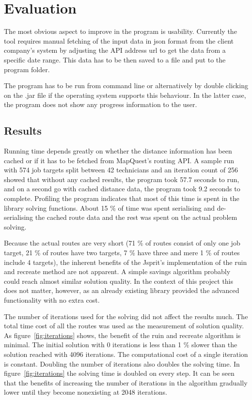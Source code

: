 \chapter{Evaluation}
\label{chapter:evaluation}


The most obvious aspect to improve in the program is usability. Currently the tool requires manual fetching of the input data in json format from the client company's system by adjusting the API address url to get the data from a specific date range. This data has to be then saved to a file and put to the program folder. 

The program has to be run from command line or alternatively by double clicking on the .jar file if the operating system supports this behaviour. In the latter case, the program does not show any progress information to the user.

\section{Results}
Running time depends greatly on whether the distance information has been cached or if it has to be fetched from MapQuest's routing API. A sample run with 574 job targets split between 42 technicians and an iteration count of 256 showed that without any cached results, the program took 57.7 seconds to run, and on a second go with cached distance data, the program took 9.2 seconds to complete. Profiling the program indicates that most of this time is spent in the library solving functions. About 15 \% of time was spent serialising and de-serialising the cached route data and the rest was spent on the actual problem solving.

Because the actual routes are very short (71 \% of routes consist of only one job target, 21 \% of routes have two targets, 7 \% have three and mere 1 \% of routes include 4 targets), the inherent benefits of the Jsprit's implementation of the ruin and recreate method are not apparent. A simple savings algorithm probably could reach almost similar solution quality. In the context of this project this does not matter, however, as an already existing library provided the advanced functionality with no extra cost. 


The number of iterations used for the solving did not affect the results much. The total time cost of all the routes was used as the measurement of solution quality. As figure~\ref{fig:iterations} shows, the benefit of the ruin and recreate algorithm is minimal. The initial solution with 0 iterations is less than 1 \% slower than the solution reached with 4096 iterations. The computational cost of a single iteration is constant. Doubling the number of iterations also doubles the solving time. In figure~\ref{fig:iterations} the solving time is doubled on every step. It can be seen that the benefits of increasing the number of iterations in the algorithm gradually lower until they become nonexisting at 2048 iterations. 

